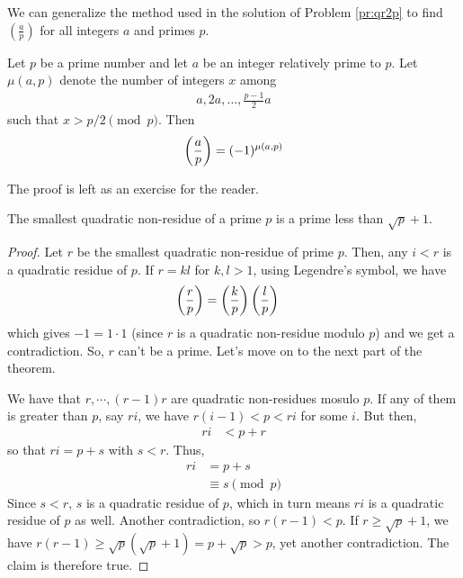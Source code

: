 We can generalize the method used in the solution of Problem \ref{pr:qr2p} to find $ \left(\frac{a}{p}\right)$ for all integers $a$ and primes $p$.
\begin{theorem}\label{thm:gausscriterion}
	Let $p$ be a prime number and let $a$ be an integer relatively prime to $p$. Let $\mu(a,p)$ denote the number of integers $x$ among
	\begin{align*}
	a, 2a, \ldots, \frac{p-1}{2}a
	\end{align*}
	such that $x > p/2 \pmod p$. Then
	\begin{align*}
		\left(\dfrac{a}{p}\right) = (-1)^{\mu(a,p)}
	\end{align*}
\end{theorem}

The proof is left as an exercise for the reader.
	\begin{theorem}
		The smallest quadratic non-residue of a prime $p$ is a prime less than $\sqrt{p}+1$.
	\end{theorem}

	\begin{proof}
		Let $r$ be the smallest quadratic non-residue of prime $p$. Then, any $i<r$ is a quadratic residue of $p$. If $r=kl$ for $k,l>1$, using Legendre's symbol, we have
		\begin{align*}
			\left(\dfrac{r}{p}\right) & = \left(\dfrac{k}{p}\right)\left(\dfrac{l}{p}\right)
		\end{align*}
		which gives $-1=1\cdot 1$ (since $r$ is a quadratic non-residue modulo $p$) and we get a contradiction. So, $r$ can't be a prime. Let's move on to the next part of the theorem.

		We have that $r,\cdots,(r-1)r$ are quadratic non-residues mosulo $p$. If any of them is greater than $p$, say $ri$, we have $r(i-1)<p<ri$ for some $i$. But then,
		\begin{align*}
			ri & < p+r
		\end{align*}
		so that $ri=p+s$ with $s<r$. Thus,
		\begin{align*}
			ri & = p+s\\
			& \equiv s\pmod p
		\end{align*}
		Since $s<r$, $s$ is a quadratic residue of $p$, which in turn means $ri$ is a quadratic residue of $p$ as well. Another contradiction, so $r(r-1)<p$. If $r\geq\sqrt{p}+1$, we have $r(r-1)\geq\sqrt{p}(\sqrt{p}+1)=p+\sqrt{p}>p$, yet another contradiction. The claim is therefore true.
	\end{proof}

